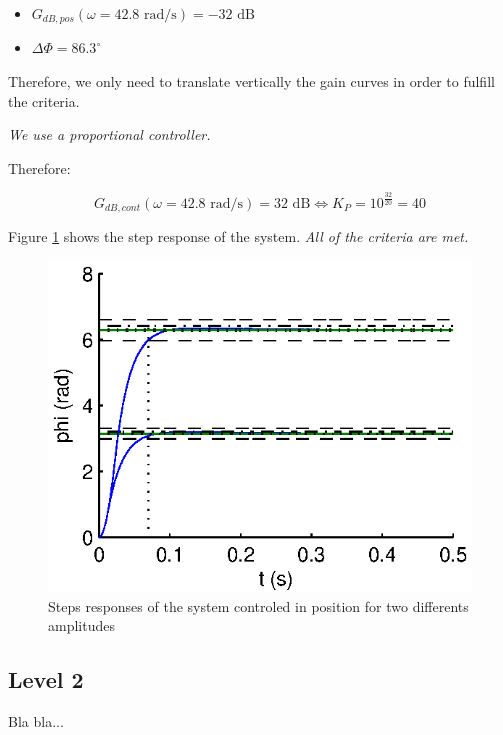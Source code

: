 \begin{itemize}
 \item $G_{dB,pos}(\omega = 42.8 \text{ rad/s}) = -32 \text{ dB}$
 \item $\Delta \Phi = 86.3^{\circ}$
\end{itemize}

Therefore, we only need to translate vertically the gain curves in order to fulfill the criteria.

\emph{We use a proportional controller.}

Therefore:

$$ G_{dB,cont}(\omega = 42.8 \text{ rad/s}) = 32 \text{ dB} \Leftrightarrow K_P = 10^{\frac{32}{20}} = 40$$

Figure \ref{StepPPos} shows the step response of the system. \emph{All of the criteria are met.}

\begin{center}
\begin{figure}[ht]
 \includegraphics[width=\linewidth]{fig/StepPPos.eps}
 \caption{Steps responses of the system controled in position for two differents amplitudes}
 \label{StepPPos}
\end{figure}
\end{center}

\subsection*{Level 2}

Bla bla...






